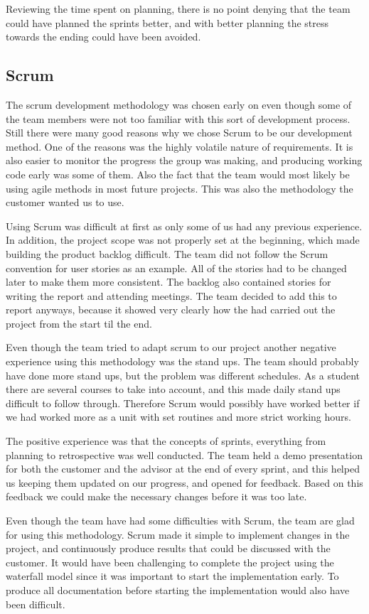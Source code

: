 Reviewing the time spent on planning, there is no point denying that the team could have planned the sprints better, and with better planning the stress towards the ending could have been avoided.   

\subsection{Scrum}
The scrum development methodology was chosen early on even though some of the team members were not too familiar with this sort of development process.
Still there were many good reasons why we chose Scrum to be our development method.
One of the reasons was the highly volatile nature of requirements.
It is also easier to monitor the progress the group was making, and producing working code early was some of them. Also the fact that the team would most likely be using agile methods in most future projects. 
This was also the methodology the customer wanted us to use. 

Using Scrum was difficult at first as only some of us had any previous experience. 
In addition, the project scope was not properly set at the beginning, which made building the product backlog difficult. 
The team did not follow the Scrum convention for user stories as an example. 
All of the stories had to be changed later to make them more consistent. 
The backlog also contained stories for writing the report and attending meetings.
The team decided to add this to report anyways, because it showed very clearly how the had carried out the project from the start til the end. 

Even though the team tried to adapt scrum to our project another negative experience using this methodology was the stand ups. The team should probably have done more stand ups, but the problem was different schedules. As a student there are several courses to take into account, and this made daily stand ups difficult to follow through. Therefore Scrum would possibly have worked better if we had worked more as a unit with set routines and more strict working hours.

The positive experience was that the concepts of sprints, everything from planning to retrospective was well conducted. The team held a demo presentation for both the customer and the advisor at the end of every sprint, and this helped us keeping them updated on our progress, and opened for feedback. Based on this feedback we could make the necessary changes before it was too late.

Even though the team have had some difficulties with Scrum, the team are glad for using this methodology. Scrum made it simple to implement changes in the project, and continuously produce results that could  be discussed with the customer. It would have been challenging to complete the project using the waterfall model since it was important to start the implementation early. To produce all documentation before starting the implementation would also have been difficult. 

